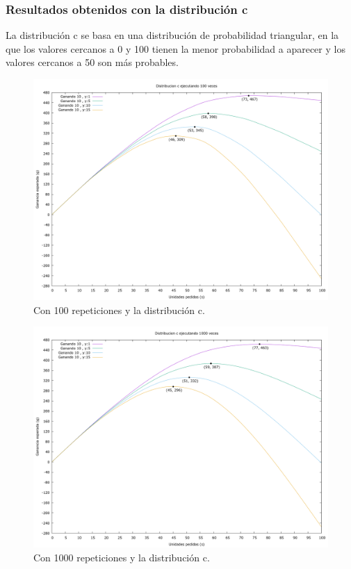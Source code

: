 \documentclass[12pt, spanish]{article}
\begin{document}
\subsubsection{Resultados obtenidos con la distribución c}


La distribución c se basa en una distribución de probabilidad triangular, en la que los valores cercanos a 0 y 100 tienen la menor probabilidad a aparecer y los valores cercanos a 50 son más probables.

\begin{figure}[H]
	\centering
	\includegraphics[scale = 0.2]{prob_c/datos_c_100.png}
	\caption{Con 100 repeticiones y la distribución c.}
	\label{fig:ej1_a_100}

\end{figure}

\begin{figure}[H]
	\centering
	\includegraphics[scale = 0.2]{prob_c/datos_c_1000.png}
	\caption{Con 1000 repeticiones y la distribución c.}
	\label{fig:ej1_a_1000}

\end{figure}
\end{document}
